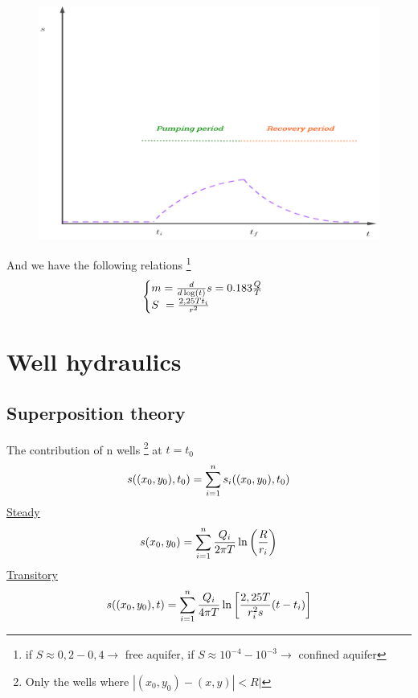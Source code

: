 \documentclass[landscape]{article}
\begin{document}
\begin{multicols*}{3}
\begin{minipage}[t]{0.5\linewidth}
  \begin{figure}[H]
  \centering
  \includegraphics[width=\linewidth]{./img/pump_test2}
\end{figure}
\end{minipage}

And we have the following relations \footnote{ if $S\approx 0,2-0,4 \rightarrow$ free aquifer, if $S\approx 10^{-4}-10^{-3} \rightarrow$ confined aquifer}
\begin{equation*}
  \begin{cases}
     m =\der{\log(t)}s = 0.183\frac{Q}{T}\\
     S = \frac{2,25 T t_i}{r^2}
  \end{cases}
\end{equation*}

\section{Well hydraulics} %
\label{sec:well_hydraulics}
\subsection{Superposition theory} %
\label{sub:superposition_theory}
The contribution of n wells \footnote{Only the wells where $ |(x_0,y_0) - (x,y)|<R|$} at $t=t_0$
\[
  s((x_0,y_0),t_0) = \sum_{i=1}^n s_i((x_0,y_0),t_0)
\]
\underline{Steady}
$$s(x_0,y_0) = \sum_{i=1}^n \frac{Q_i}{2\pi T}\ln \left(\frac{R}{r_i}\right)$$
\underline{Transitory}
\[
  s((x_0,y_0),t) = \sum_{i=1}^n \frac{Q_i}{4\pi T}\ln \left[\frac{2,25 T}{r_i^2s}(t-t_i)\right]
\]


\end{multicols*}
\end{document}
